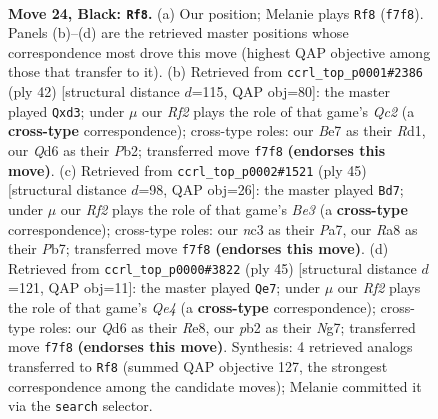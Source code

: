 \documentclass[11pt]{article}
\begin{document}
\clearpage

\begin{figure}[p]\centering
\begin{subfigure}{0.46\textwidth}\centering
\resizebox{\linewidth}{!}{%
\newchessgame
\chessboard[
  setfen={rn2k2R/p3br2/1p1qQ3/3pN1P1/P7/2NB4/1P3P2/R1B1K3 b Q - 2 24},
  showmover=false,
  pgfstyle=straightmove, color=movearrow, markmove={f7-f8}
]}
\caption{}
\end{subfigure}\hfill
\begin{subfigure}{0.46\textwidth}\centering
\resizebox{\linewidth}{!}{%
\newchessgame
\chessboard[
  setfen={2r1k2r/pp3p2/7p/3p4/1b5B/2NnPP2/1PQ3P1/q2RK2R w Kk - 3 22},
  showmover=false,
  pgfstyle=straightmove, color=movearrow, markmove={c2-d3}
]}
\caption{}
\end{subfigure}
\\[4pt]
\begin{subfigure}{0.46\textwidth}\centering
\resizebox{\linewidth}{!}{%
\newchessgame
\chessboard[
  setfen={6k1/pp5p/1nn1brpQ/4q1N1/8/5B1P/PP3PP1/3R2K1 b - - 2 23},
  showmover=false,
  pgfstyle=straightmove, color=movearrow, markmove={e6-d7}
]}
\caption{}
\end{subfigure}\hfill
\begin{subfigure}{0.46\textwidth}\centering
\resizebox{\linewidth}{!}{%
\newchessgame
\chessboard[
  setfen={r1b1r1k1/1p4np/6p1/p1Rpq3/8/5N1P/PP3RP1/1B1Q2K1 b - - 1 23},
  showmover=false,
  pgfstyle=straightmove, color=movearrow, markmove={e5-e7}
]}
\caption{}
\end{subfigure}
\caption{\textbf{Move 24, Black: \texttt{Rf8}.} (a) Our position; Melanie plays \texttt{Rf8} (\texttt{f7f8}). Panels (b)--(d) are the retrieved master positions whose correspondence most drove this move (highest QAP objective among those that transfer to it). (b) Retrieved from \texttt{ccrl\_top\_p0001\#2386} (ply 42) [structural distance $d$=115, QAP obj=80]: the master played \texttt{Qxd3}; under $\mu$ our \emph{Rf2} plays the role of that game's \emph{Qc2} (a \textbf{cross-type} correspondence); cross-type roles: our \emph{B}e7 as their \emph{R}d1, our \emph{Q}d6 as their \emph{P}b2; transferred move \texttt{f7f8} \textbf{(endorses this move)}. (c) Retrieved from \texttt{ccrl\_top\_p0002\#1521} (ply 45) [structural distance $d$=98, QAP obj=26]: the master played \texttt{Bd7}; under $\mu$ our \emph{Rf2} plays the role of that game's \emph{Be3} (a \textbf{cross-type} correspondence); cross-type roles: our \emph{n}c3 as their \emph{P}a7, our \emph{R}a8 as their \emph{P}b7; transferred move \texttt{f7f8} \textbf{(endorses this move)}. (d) Retrieved from \texttt{ccrl\_top\_p0000\#3822} (ply 45) [structural distance $d$=121, QAP obj=11]: the master played \texttt{Qe7}; under $\mu$ our \emph{Rf2} plays the role of that game's \emph{Qe4} (a \textbf{cross-type} correspondence); cross-type roles: our \emph{Q}d6 as their \emph{R}e8, our \emph{p}b2 as their \emph{N}g7; transferred move \texttt{f7f8} \textbf{(endorses this move)}. Synthesis: 4 retrieved analogs transferred to \texttt{Rf8} (summed QAP objective 127, the strongest correspondence among the candidate moves); Melanie committed it via the \texttt{search} selector.}
\label{fig:thought-m47}
\end{figure}
\end{document}
